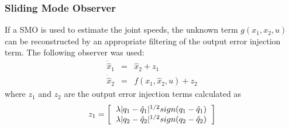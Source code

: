 \documentclass[9pt,spanish,aspectratio=1610]{beamer}
\begin{document}
\begin{frame}\frametitle{Sliding Mode Observer}
  If a SMO is used to estimate the joint speeds, the unknown term $g(x_1, x_2, u)$ can be reconstructed by an appropriate filtering of the output error injection term. The following observer was used:
  \begin{eqnarray}
    \dot{\hat{x}}_1 &=& \hat{x}_2 + z_1\label{eq:model1}\\
    \dot{\hat{x}}_2 &=& f(x_1, \hat{x}_2, u) + z_2\label{eq:model2}
  \end{eqnarray}
  where $z_1$ and $z_2$ are the output error injection terms calculated as
  \[ z_1 = \left[\begin{tabular}{c}
      $\lambda\vert q_1 - \hat{q}_1\vert ^{1/2}sign(q_1 - \hat{q}_1)$ \\
      $\lambda\vert q_2 - \hat{q}_2\vert ^{1/2}sign(q_2 - \hat{q}_2)$
    \end{tabular}\right]
  \]
\end{frame}
\end{document}
